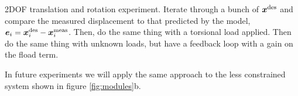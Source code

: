 


2DOF translation and rotation experiment. Iterate through a bunch of $\x^\tx{des}$ and compare the measured displacement to that predicted by the model, $\vec{e}_i = \x^\tx{des}_i - \x^\tx{meas}_i$. Then, do the same thing with a torsional load applied. Then do the same thing with unknown loads, but have a feedback loop with a gain on the fload term.




In future experiments we will apply the same approach to the less constrained system shown in figure \ref{fig:modules}b.

